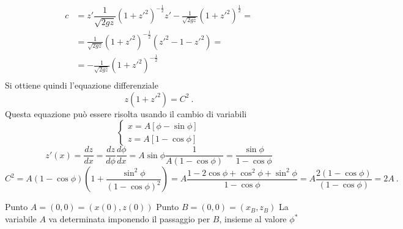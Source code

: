 \begin{example}[Brachistocrona]
    \begin{equation}
    \begin{aligned}
        c & = z' \dfrac{1}{\sqrt{2gz}} \left( 1 + z'^2 \right)^{-\frac{1}{2}} z' - \frac{1}{\sqrt{2 g z}} \left( 1 + z'^2 \right)^{\frac{1}{2}} = \\
        & =  \frac{1}{\sqrt{2gz}} \left( 1 + z'^2 \right)^{-\frac{1}{2}} \left( z'^2 - 1 - z'^2 \right) = \\
        & = -\frac{1}{\sqrt{2gz}} \left( 1 + z'^2 \right)^{-\frac{1}{2}}  \\
    \end{aligned}
    \end{equation}
    Si ottiene quindi l'equazione differenziale
    \begin{equation}
       z ( 1 + z'^2) = C^2 \ .
    \end{equation}
    Questa equazione può essere risolta usando il cambio di variabili
    \begin{equation}
    \begin{cases}
        x = A \left[ \phi - \sin \phi \right] \\
        z = A \left[ 1 - \cos \phi \right]
    \end{cases}
    \end{equation}
    \begin{equation}
        z'(x) = \dfrac{d z}{dx} = \dfrac{dz}{d\phi} \dfrac{d\phi}{dx} = A \sin \phi \dfrac{1}{A(1-\cos \phi)} = \dfrac{\sin \phi}{1- \cos \phi}
    \end{equation}
    \begin{equation}
        C^2 = A \left( 1 - \cos \phi \right) \left( 1 + \dfrac{\sin^2 \phi}{(1-\cos\phi)^2} \right) = A \dfrac{1-2\cos\phi + \cos^2 \phi + \sin^2 \phi}{1-\cos\phi} = A \dfrac{2 (1-\cos \phi)}{(1-\cos \phi)} = 2A \ .
    \end{equation}

    Punto $A = (0,0) = (x(0), z(0))$
    Punto $B = (0,0) = (x_B, z_B)$
    La variabile $A$ va determinata imponendo il passaggio per $B$, insieme al valore $\phi^*$
\end{example}





